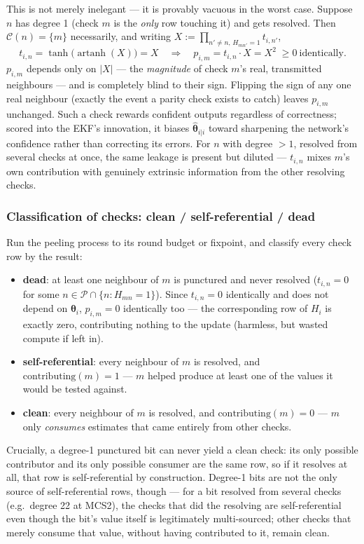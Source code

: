 \documentclass{article}
\newcommand{\state}{\boldsymbol{\theta}}
\begin{document}
This is not merely inelegant — it is provably vacuous in the worst case. Suppose $n$ has
degree 1 (check $m$ is the \emph{only} row touching it) and gets resolved. Then
$\mathcal{C}(n) = \{m\}$ necessarily, and writing $X := \prod_{n' \ne n,\,H_{mn'}=1} t_{i,n'}$,
\begin{equation}
t_{i,n} = \tanh\!\big(\operatorname{artanh}(X)\big) = X
\quad\Longrightarrow\quad
p_{i,m} = t_{i,n} \cdot X = X^2 \;\ge 0 \ \text{identically.}
\end{equation}
$p_{i,m}$ depends only on $|X|$ — the \emph{magnitude} of check $m$'s real, transmitted
neighbours — and is completely blind to their sign. Flipping the sign of any one real neighbour
(exactly the event a parity check exists to catch) leaves $p_{i,m}$ unchanged. Such a check
rewards confident outputs regardless of correctness; scored into the EKF's innovation, it
biases $\hat{\state}_{i|i}$ toward sharpening the network's confidence rather than correcting
its errors. For $n$ with degree $>1$, resolved from several checks at once, the same leakage is
present but diluted — $t_{i,n}$ mixes $m$'s own contribution with genuinely extrinsic
information from the other resolving checks.

\subsubsection*{Classification of checks: clean / self-referential / dead}

Run the peeling process to its round budget or fixpoint, and classify every check row by the
result:
\begin{itemize}[itemsep=2pt]
  \item \textbf{dead}: at least one neighbour of $m$ is punctured and never resolved
  ($t_{i,n}=0$ for some $n \in \mathcal{P} \cap \{n : H_{mn}=1\}$). Since $t_{i,n}=0$
  identically and does not depend on $\state_i$, $p_{i,m}=0$ identically too — the
  corresponding row of $H_i$ is exactly zero, contributing nothing to the update (harmless,
  but wasted compute if left in).
  \item \textbf{self-referential}: every neighbour of $m$ is resolved, and
  $\text{contributing}(m)=1$ — $m$ helped produce at least one of the values it would be
  tested against.
  \item \textbf{clean}: every neighbour of $m$ is resolved, and $\text{contributing}(m)=0$ — $m$
  only \emph{consumes} estimates that came entirely from other checks.
\end{itemize}
Crucially, a degree-1 punctured bit can never yield a clean check: its only possible
contributor and its only possible consumer are the same row, so if it resolves at all, that
row is self-referential by construction. Degree-1 bits are not the only source of
self-referential rows, though — for a bit resolved from several checks (e.g.\ degree 22 at
MCS2), the checks that did the resolving are self-referential even though the bit's value
itself is legitimately multi-sourced; other checks that merely consume that value, without
having contributed to it, remain clean.
\end{document}
